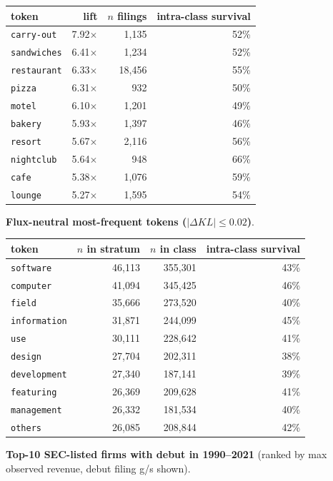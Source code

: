 \begin{tabular}{lrrr}
\toprule
token & lift & $n$ filings & intra-class survival \\
\midrule
\texttt{carry-out} & 7.92$\times$ & 1,135 & 52\% \\
\texttt{sandwiches} & 6.41$\times$ & 1,234 & 52\% \\
\texttt{restaurant} & 6.33$\times$ & 18,456 & 55\% \\
\texttt{pizza} & 6.31$\times$ & 932 & 50\% \\
\texttt{motel} & 6.10$\times$ & 1,201 & 49\% \\
\texttt{bakery} & 5.93$\times$ & 1,397 & 46\% \\
\texttt{resort} & 5.67$\times$ & 2,116 & 56\% \\
\texttt{nightclub} & 5.64$\times$ & 948 & 66\% \\
\texttt{cafe} & 5.38$\times$ & 1,076 & 59\% \\
\texttt{lounge} & 5.27$\times$ & 1,595 & 54\% \\
\bottomrule
\end{tabular}

\textbf{Flux-neutral most-frequent tokens ($|\Delta KL|\leq 0.02$)}.

\begin{tabular}{lrrr}
\toprule
token & $n$ in stratum & $n$ in class & intra-class survival \\
\midrule
\texttt{software} & 46,113 & 355,301 & 43\% \\
\texttt{computer} & 41,094 & 345,425 & 46\% \\
\texttt{field} & 35,666 & 273,520 & 40\% \\
\texttt{information} & 31,871 & 244,099 & 45\% \\
\texttt{use} & 30,111 & 228,642 & 41\% \\
\texttt{design} & 27,704 & 202,311 & 38\% \\
\texttt{development} & 27,340 & 187,141 & 39\% \\
\texttt{featuring} & 26,369 & 209,628 & 41\% \\
\texttt{management} & 26,332 & 181,534 & 40\% \\
\texttt{others} & 26,085 & 208,844 & 42\% \\
\bottomrule
\end{tabular}

\textbf{Top-10 SEC-listed firms with debut in 1990--2021} (ranked by max observed revenue, debut filing g/s shown).

